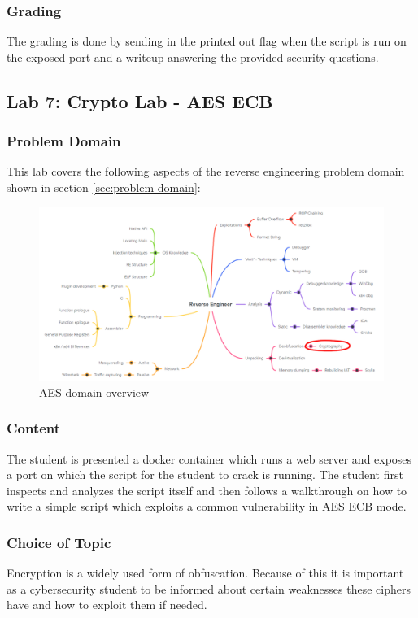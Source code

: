 \subsubsection*{Grading}
The grading is done by sending in the printed out flag when the script is run on the exposed port and a writeup answering the provided security questions.
\pagebreak

\subsection{Lab 7: Crypto Lab - AES ECB}
\subsubsection*{Problem Domain}
This lab covers the following aspects of the reverse engineering problem domain shown in section \ref{sec:problem-domain}:
\vspace{-2ex}
\begin{figure}[H]
    \includegraphics[width=\textwidth]{resources/aes-overview-light.png}
    \caption{AES domain overview}
    \label{fig:aes-overview}
\end{figure}
\subsubsection*{Content}
The student is presented a docker container which runs a web server and exposes a port on which the script for the student to crack is running. The student first inspects and analyzes the script itself and then follows a walkthrough on how to write a simple script which exploits a common vulnerability in AES ECB mode. 
\subsubsection*{Choice of Topic}
Encryption is a widely used form of obfuscation. Because of this it is important as a cybersecurity student to be informed about certain weaknesses these ciphers have and how to exploit them if needed. 
